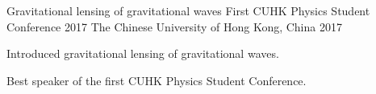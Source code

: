 \begin{cventries}
  \cventry
    {Gravitational lensing of gravitational waves} %
    {First CUHK Physics Student Conference 2017} %
    {The Chinese University of Hong Kong, China} %
    {2017} %
    {
      \begin{cvitems} %
        \item {Introduced gravitational lensing of gravitational waves.}
        \item {Best speaker of the first CUHK Physics Student Conference.}
      \end{cvitems}
    }

\end{cventries}

